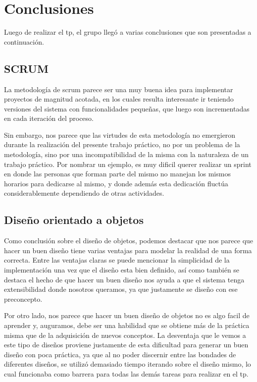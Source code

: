 \section{Conclusiones}

Luego de realizar el tp, el grupo lleg\'o a varias conclusiones que son presentadas a continuaci\'on.


\subsection{SCRUM}
La metodolog\'ia de scrum parece ser una muy buena idea para implementar proyectos de magnitud acotada, en los cuales resulta interesante ir teniendo versiones del sistema con funcionalidades pequeñas, que luego son incrementadas en cada iteraci\'on del proceso.

Sin embargo, nos parece que las virtudes de esta metodolog\'ia no emergieron durante la realizaci\'on del presente trabajo pr\'actico, no por un problema de la metodolog\'ia, sino por una incompatibilidad de la misma con la naturaleza de un trabajo pr\'actico. Por nombrar un ejemplo, es muy dificil querer realizar un sprint en donde las personas que forman parte del mismo no manejan los mismos horarios para dedicarse al mismo, y donde adem\'as esta dedicaci\'on fluct\'ua considerablemente dependiendo de otras actividades.

\subsection{Diseño orientado a objetos}

Como conclusi\'on sobre el diseño de objetos, podemos destacar que nos parece que hacer un buen diseño tiene varias ventajas para modelar la realidad de una forma correcta. Entre las ventajas claras se puede mencionar la simplicidad de la implementaci\'on una vez que el diseño esta bien definido, as\'i como tambi\'en se destaca el hecho de que hacer un buen diseño nos ayuda a que el sistema tenga extensibilidad donde nosotros queramos, ya que justamente se diseño con ese preconcepto.

Por otro lado, nos parece que hacer un buen diseño de objetos no es algo facil de aprender y, auguramos, debe ser una habilidad que se obtiene m\'as de la pr\'actica misma que de la adquisici\'on de nuevos conceptos. La desventaja que le vemos a este tipo de diseños proviene justamente de esta dificultad para generar un buen diseño con poca pr\'actica, ya que al no poder discernir entre las bondades de diferentes diseños, se utiliz\'o demasiado tiempo iterando sobre el diseño mismo, lo cual funcionaba como barrera para todas las dem\'as tareas para realizar en el tp.


